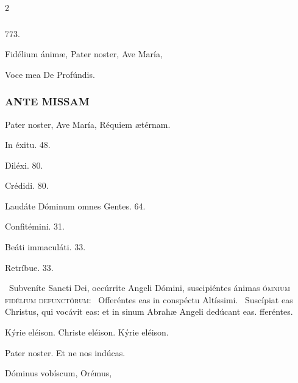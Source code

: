\documentclass[9pt,twoside]{extarticle}
\begin{document}
\begin{multicols}{2}
\subsubsection*{\center {}}

\begin{tightlist}{}
\item {} 773. 
\item {} Fidélium ánimæ, Pater noster,  Ave María, 
\item {}
\item {} Voce mea  De Profúndis.
\end{tightlist}

\subsubsection*{\center \textsc{ANTE MISSAM}\\ }
\begin{tightlist}{}
\item {} Pater noster,  Ave María,  Réquiem ætérnam.
\item {} In éxitu. 48.
\item {} Diléxi. 80.
\item {} Crédidi. 80.
\item {} Laudáte Dóminum omnes Gentes. 64.
\item {} Confitémini. 31.
\item {} Beáti immaculáti. 33.
\item {} Retríbue. 33.
\item {}
\item {}~Subveníte Sancti Dei, occúrrite Angeli Dómini, suscipiéntes ánimas \textsc{ómnium fidélium defunctórum}: \textred{*}~Offeréntes eas in conspéctu Altíssimi. ~Suscípiat eas Christus, qui vocávit eas: et in sinum Abrahæ Angeli dedúcant eas. fferéntes.
\item Kýrie eléison. Christe eléison. Kýrie eléison.
\item Pater noster. Et ne nos indúcas.
\item {} Dóminus vobíscum,  Orémus, 
\end{tightlist}


\end{multicols}
\end{document}
